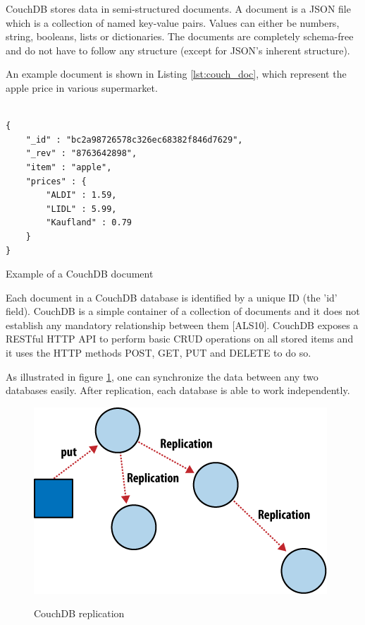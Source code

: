 CouchDB stores data in semi-structured documents. A document is a JSON file which is a collection of named key-value pairs. Values can either be numbers, string, booleans, lists or dictionaries. The documents are completely schema-free and do not have to follow any structure (except for JSON’s inherent structure).

An example document is shown in Listing \ref{lst:couch_doc}, which represent the apple price in various supermarket. 
\\
\\
\begin{code}
\begin{verbatim}
{
    "_id" : "bc2a98726578c326ec68382f846d7629",
    "_rev" : "8763642898",
    "item" : "apple",
    "prices" : {
        "ALDI" : 1.59,
        "LIDL" : 5.99,
        "Kaufland" : 0.79
    }
}
\end{verbatim}
\caption{Example of a CouchDB document}
\label{lst:couch_doc}
\end{code}

Each document in a CouchDB database is identified by a unique ID (the 'id' field). CouchDB is a simple container of a collection of documents and it does not establish any mandatory relationship between them [ALS10].  CouchDB exposes a RESTful HTTP API to perform basic CRUD operations on all stored items and it uses the HTTP methods POST, GET, PUT and DELETE to do so.

As illustrated in figure \ref{fig:couchdb_repl}, one can synchronize the data between any two databases easily. After replication, each database is able to work independently.
\begin{figure}[htb]
  \centering
  \includegraphics{couchdb_repl.png}\\
  \caption{CouchDB replication}
  \label{fig:couchdb_repl}
\end{figure}

